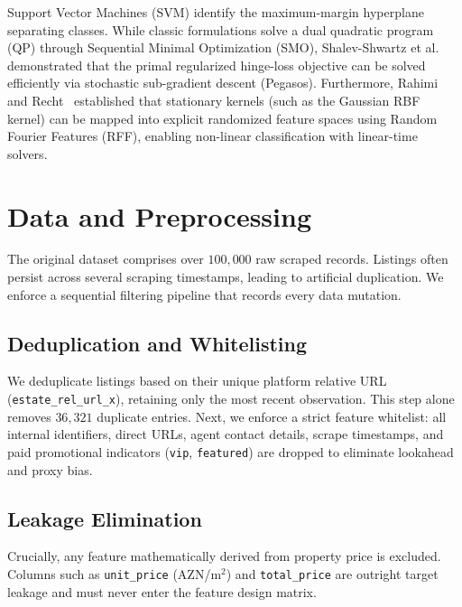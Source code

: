 \documentclass[10pt,twocolumn,a4paper]{article}
\begin{document}
Support Vector Machines (SVM) identify the maximum-margin hyperplane separating classes. While classic formulations solve a dual quadratic program (QP) through Sequential Minimal Optimization (SMO), Shalev-Shwartz et al.~\cite{pegasos} demonstrated that the primal regularized hinge-loss objective can be solved efficiently via stochastic sub-gradient descent (Pegasos). Furthermore, Rahimi and Recht~\cite{rahimi2007} established that stationary kernels (such as the Gaussian RBF kernel) can be mapped into explicit randomized feature spaces using Random Fourier Features (RFF), enabling non-linear classification with linear-time solvers.

\section{Data and Preprocessing}
The original dataset comprises over $100,000$ raw scraped records. Listings often persist across several scraping timestamps, leading to artificial duplication. We enforce a sequential filtering pipeline that records every data mutation.

\subsection{Deduplication and Whitelisting}
We deduplicate listings based on their unique platform relative URL (\texttt{estate\_rel\_url\_x}), retaining only the most recent observation. This step alone removes $36,321$ duplicate entries. Next, we enforce a strict feature whitelist: all internal identifiers, direct URLs, agent contact details, scrape timestamps, and paid promotional indicators (\texttt{vip}, \texttt{featured}) are dropped to eliminate lookahead and proxy bias.

\subsection{Leakage Elimination}
Crucially, any feature mathematically derived from property price is excluded. Columns such as \texttt{unit\_price} (AZN/m$^2$) and \texttt{total\_price} are outright target leakage and must never enter the feature design matrix.
\end{document}
